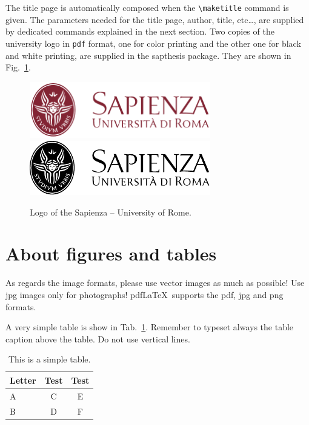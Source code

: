 \documentclass[Lau,binding=0.6cm]{sapthesis}
\newcommand{\bs}{\textbackslash}
\begin{document}
The title page is automatically composed when the \texttt{\bs maketitle} command is given.
The parameters needed for the title page, author, title, etc\ldots , are supplied by dedicated commands explained in the next section.
Two copies of the university logo in \texttt{pdf} format, one for color printing and the other one for black and white printing, are supplied in the \textsf{sapthesis} package. They are shown in Fig.~\ref{fig:largenenough}.

\begin{figure}
\centering
\includegraphics[width=0.7\textwidth]{sapienza-MLred-pos}\\[3ex]
\includegraphics[width=0.7\textwidth]{sapienza-MLblack-pos}
\caption{Logo of the Sapienza -- University of Rome.}
\label{fig:largenenough}
\end{figure}



\section{About figures and tables}

As regards the image formats, please use vector images as much as possible! Use jpg images only for photographs! pdf\LaTeX\ supports the pdf, jpg and png formats.

A very simple table is show in Tab.~\ref{tab:letters}. Remember to typeset
always the table caption above the table. Do not use vertical lines.

\begin{table}
\caption{This is a simple table.}
\label{tab:letters}
\centering
\begin{tabular}{lcc}
\toprule
Letter & Test & Test \\
\midrule
A & C & E \\
B & D & F \\
\bottomrule
\end{tabular}
\end{table}
\end{document}

